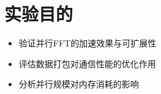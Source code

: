 \documentclass{SYSUReport}
\date{2025年5月7日}
\begin{document}
\cover
\thispagestyle{empty} %
\clearpage



\section{实验目的}
\begin{itemize}
   \item 验证并行FFT的加速效果与可扩展性
    \item 评估数据打包对通信性能的优化作用
    \item 分析并行规模对内存消耗的影响
\end{itemize}
\end{document}
